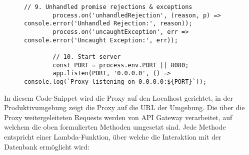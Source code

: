 \begin{figure}[bht]
\begin{lstlisting}[caption=EC2-Proxy in NodeJS, label=list:proxy]
		// 9. Unhandled promise rejections & exceptions
		process.on('unhandledRejection', (reason, p) => console.error('Unhandled Rejection:', reason));
		process.on('uncaughtException', err => console.error('Uncaught Exception:', err));

		// 10. Start server
		const PORT = process.env.PORT || 8080;
		app.listen(PORT, '0.0.0.0', () => console.log(`Proxy listening on 0.0.0.0:${PORT}`));

    \end{lstlisting}
\end{figure}
In diesem Code-Snippet wird die Proxy auf den Localhost gerichtet, in der Produktivumgebung zeigt die Proxy auf die URL der Umgebung. 
Die über die Proxy weitergeleiteten Requests werden von API Gateway verarbeitet, auf welchem die oben formulierten Methoden umgesetzt sind. 
Jede Methode entspricht einer Lambda-Funktion, über welche die Interaktion mit der Datenbank ermöglicht wird:
